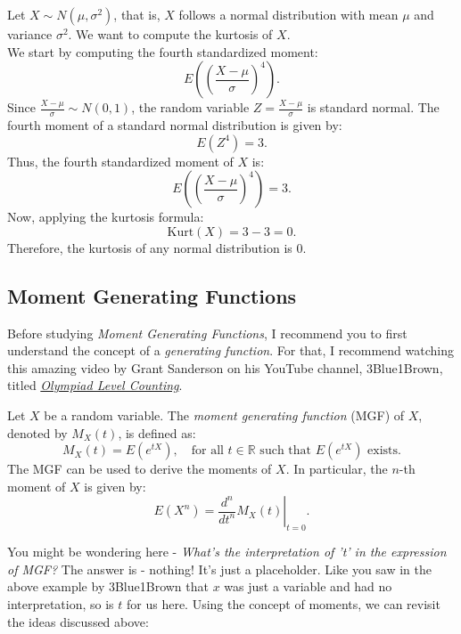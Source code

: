 \begin{example}
    Let \( X \sim N(\mu, \sigma^2) \), that is, \( X \) follows a normal distribution with mean \( \mu \) and variance \( \sigma^2 \). We want to compute the kurtosis of \( X \).\\

We start by computing the fourth standardized moment:
\[
E\left( \left( \frac{X - \mu}{\sigma} \right)^4 \right).
\]
Since \( \frac{X - \mu}{\sigma} \sim N(0, 1) \), the random variable \( Z = \frac{X - \mu}{\sigma} \) is standard normal. The fourth moment of a standard normal distribution is given by:
\[
E(Z^4) = 3.
\]
Thus, the fourth standardized moment of \( X \) is:
\[
E\left( \left( \frac{X - \mu}{\sigma} \right)^4 \right) = 3.
\]
Now, applying the kurtosis formula:
\[
\text{Kurt}(X) = 3 - 3 = 0.
\]
Therefore, the kurtosis of any normal distribution is 0.
\end{example}

\subsection{Moment Generating Functions}

Before studying \textit{Moment Generating Functions}, I recommend you to first understand the concept of a \textit{generating function}. For that, I recommend watching this amazing video by Grant Sanderson on his YouTube channel, 3Blue1Brown, titled \href{https://www.youtube.com/watch?v=bOXCLR3Wric}{\textit{Olympiad Level Counting}}.\cite{generatingfunction}

\begin{definition}
    Let \( X \) be a random variable. The \textit{moment generating function} (MGF) of \( X \), denoted by \( M_X(t) \), is defined as:
\[
M_X(t) = E\left(e^{tX}\right), \quad \text{for all } t \in \mathbb{R} \text{ such that } E\left(e^{tX}\right) \text{ exists}.
\]
The MGF can be used to derive the moments of \( X \). In particular, the \( n \)-th moment of \( X \) is given by:
\[
E(X^n) = \left. \frac{d^n}{dt^n} M_X(t) \right|_{t=0}.
\]
\end{definition}

You might be wondering here - \textit{What's the interpretation of 't' in the expression of MGF?} The answer is - nothing! It's just a placeholder. Like you saw in the above example by 3Blue1Brown that $x$ was just a variable and had no interpretation, so is $t$ for us here. Using the concept of moments, we can revisit the ideas discussed above: \\

